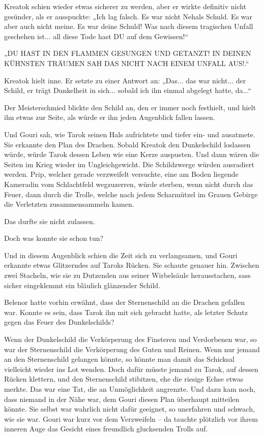 Kreatok schien wieder etwas sicherer zu werden, aber er wirkte definitiv nicht gesünder, als er ausspuckte: „Ich lag falsch. Es war nicht Nehals Schuld. Es war aber auch nicht meine. Es war deine Schuld! Was nach diesem tragischen Unfall geschehen ist... all diese Tode hast DU auf dem Gewissen!“

„DU HAST IN DEN FLAMMEN GESUNGEN UND GETANZT! IN DEINEN KÜHNSTEN TRÄUMEN SAH DAS NICHT NACH EINEM UNFALL AUS!.“

Kreatok hielt inne. Er setzte zu einer Antwort an: „Das... das war nicht... der Schild, er trägt Dunkelheit in sich... sobald ich ihn einmal abgelegt hatte, da...“

Der Meisterschmied blickte den Schild an, den er immer noch festhielt, und hielt ihn etwas zur Seite, als würde er ihn jeden Augenblick fallen lassen.

Und Gouri sah, wie Tarok seinen Hals aufrichtete und tiefer ein- und ausatmete. Sie erkannte den Plan des Drachen. Sobald Kreatok den Dunkelschild loslassen würde, würde Tarok dessen Leben wie eine Kerze auspusten. Und dann wären die Seiten im Krieg wieder im Ungleichgewicht. Die Schildzwerge würden ausradiert werden. Prip, welcher gerade verzweifelt versuchte, eine am Boden liegende Kameradin vom Schlachtfeld wegzuzerren, würde sterben, wenn nicht durch das Feuer, dann durch die Trolle, welche nach jedem Scharmützel im Grauen Gebirge die Verletzten zusammensammeln kamen.

Das durfte sie nicht zulassen.

Doch was konnte sie schon tun?

Und in diesem Augenblick schien die Zeit sich zu verlangsamen, und Gouri erkannte etwas Glitzerndes auf Taroks Rücken. Sie schaute genauer hin. Zwischen zwei Stacheln, wie sie zu Dutzenden aus seiner Wirbelsäule herausstachen, sass sicher eingeklemmt ein bläulich glänzender Schild.

Belenor hatte vorhin erwähnt, dass der Sternenschild an die Drachen gefallen war. Konnte es sein, dass Tarok ihn mit sich gebracht hatte, als letzter Schutz gegen das Feuer des Dunkelschilds?

Wenn der Dunkelschild die Verkörperung des Finsteren und Verdorbenen war, so war der Sternenschild die Verkörperung des Guten und Reinen. Wenn nur jemand an den Sternenschild gelangen könnte, so könnte man damit das Schicksal vielleicht wieder ins Lot wenden. Doch dafür müsste jemand zu Tarok, auf dessen Rücken klettern, und den Sternenschild stibitzen, ehe die riesige Echse etwas merkte. Das war eine Tat, die an Unmöglichkeit angrenzte. Und dazu kam noch, dass niemand in der Nähe war, dem Gouri diesen Plan überhaupt mitteilen könnte. Sie selbst war wahrlich nicht dafür geeignet, so unerfahren und schwach, wie sie war. Gouri war kurz vor dem Verzweifeln – da tauchte plötzlich vor ihrem inneren Auge das Gesicht eines freundlich glucksenden Trolls auf.



